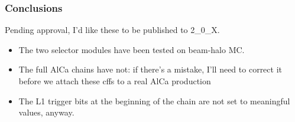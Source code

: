 \documentclass[compress]{beamer}
\begin{document}

\begin{frame}
\frametitle{Conclusions}

Pending approval, I'd like these to be published to 2\_0\_X.

\vfill
\begin{itemize}\setlength{\itemsep}{0.35 cm}
\item The two selector modules have been tested on beam-halo MC.
\item The full AlCa chains have not: if there's a mistake, I'll need
to correct it before we attach these cffs to a real AlCa production
\item The L1 trigger bits at the beginning of the chain are not set to
meaningful values, anyway.
\end{itemize}

\label{numpages}
\end{frame}
\end{document}
